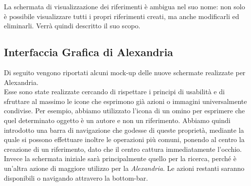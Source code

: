 La schermata di visualizzazione dei riferimenti è ambigua nel suo nome: non solo è possibile visualizzare tutti i propri riferimenti creati, ma anche modificarli ed eliminarli. Verrà quindi descritto il suo scopo. \\
\raggedright{\subsection{Interfaccia Grafica di Alexandria}}
Di seguito vengono riportati alcuni mock-up delle nuove schermate realizzate per Alexandria.\\
Esse sono state realizzate cercando di rispettare i principi di usabilità e di sfruttare al massimo le icone che esprimono già azioni o immagini universalmente condivise. Per esempio, abbiamo utilizzato l'icona di un omino per esprimere che quel determinato oggetto è un autore e non un riferimento. Abbiamo quindi introdotto una barra di navigazione che godesse di queste proprietà, mediante la quale si possono effettuare inoltre le operazioni più comuni, ponendo al centro la creazione di un riferimento, dato che il centro cattura immediatamente l'occhio. Invece la schermata iniziale sarà principalmente quello per la ricerca, perché è un'altra azione di maggiore utilizzo per la \textit{Alexandria}. Le azioni restanti saranno disponibili o navigando attravero la bottom-bar.
\newpage
